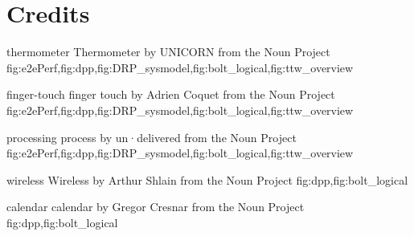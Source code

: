 
\chapter*{Credits}

\creditItem
{thermometer}
{Thermometer by UNICORN from the Noun Project}
{fig:e2ePerf,fig:dpp,fig:DRP_sysmodel,fig:bolt_logical,fig:ttw_overview}

\creditItem
{finger-touch}
{finger touch by Adrien Coquet from the Noun Project}
{fig:e2ePerf,fig:dpp,fig:DRP_sysmodel,fig:bolt_logical,fig:ttw_overview}

\creditItem
{processing}
{process by un·delivered from the Noun Project}
{fig:e2ePerf,fig:dpp,fig:DRP_sysmodel,fig:bolt_logical,fig:ttw_overview}

\creditItem
{wireless}
{Wireless by Arthur Shlain from the Noun Project}
{fig:dpp,fig:bolt_logical}

\creditItem
{calendar}
{calendar by Gregor Cresnar from the Noun Project}
{fig:dpp,fig:bolt_logical}

